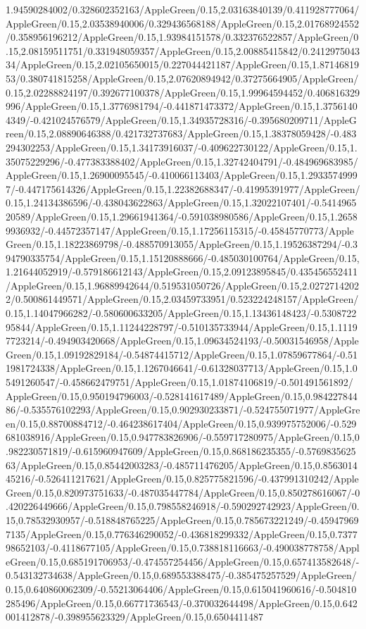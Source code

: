 {\begin{tikzternal}
{1.94590284002/0.328602352163/AppleGreen/0.15,2.03163840139/0.411928777064/AppleGreen/0.15,2.03538940006/0.329436568188/AppleGreen/0.15,2.01768924552/0.358956196212/AppleGreen/0.15,1.93984151578/0.332376522857/AppleGreen/0.15,2.08159511751/0.331948059357/AppleGreen/0.15,2.00885415842/0.241297504334/AppleGreen/0.15,2.02105650015/0.227044421187/AppleGreen/0.15,1.8714681953/0.380741815258/AppleGreen/0.15,2.07620894942/0.37275664905/AppleGreen/0.15,2.02288824197/0.392677100378/AppleGreen/0.15,1.99964594452/0.406816329996/AppleGreen/0.15,1.3776981794/-0.441871473372/AppleGreen/0.15,1.37561404349/-0.421024576579/AppleGreen/0.15,1.34935728316/-0.395680209711/AppleGreen/0.15,2.08890646388/0.421732737683/AppleGreen/0.15,1.38378059428/-0.483294302253/AppleGreen/0.15,1.34173916037/-0.409622730122/AppleGreen/0.15,1.35075229296/-0.477383388402/AppleGreen/0.15,1.32742404791/-0.484969683985/AppleGreen/0.15,1.26900095545/-0.410066113403/AppleGreen/0.15,1.29335749997/-0.447175614326/AppleGreen/0.15,1.22382688347/-0.41995391977/AppleGreen/0.15,1.24134386596/-0.438043622863/AppleGreen/0.15,1.32022107401/-0.541496520589/AppleGreen/0.15,1.29661941364/-0.591038980586/AppleGreen/0.15,1.26589936932/-0.44572357147/AppleGreen/0.15,1.17256115315/-0.45845770773/AppleGreen/0.15,1.18223869798/-0.488570913055/AppleGreen/0.15,1.19526387294/-0.394790335754/AppleGreen/0.15,1.15120888666/-0.485030100764/AppleGreen/0.15,1.21644052919/-0.579186612143/AppleGreen/0.15,2.09123895845/0.435456552411/AppleGreen/0.15,1.96889942644/0.519531050726/AppleGreen/0.15,2.02727142022/0.500861449571/AppleGreen/0.15,2.03459733951/0.523224248157/AppleGreen/0.15,1.14047966282/-0.580600633205/AppleGreen/0.15,1.13436148423/-0.530872295844/AppleGreen/0.15,1.11244228797/-0.510135733944/AppleGreen/0.15,1.11197723214/-0.494903420668/AppleGreen/0.15,1.09634524193/-0.50031546958/AppleGreen/0.15,1.09192829184/-0.54874415712/AppleGreen/0.15,1.07859677864/-0.511981724338/AppleGreen/0.15,1.1267046641/-0.61328037713/AppleGreen/0.15,1.05491260547/-0.458662479751/AppleGreen/0.15,1.01874106819/-0.501491561892/AppleGreen/0.15,0.950194796003/-0.528141617489/AppleGreen/0.15,0.98422784486/-0.535576102293/AppleGreen/0.15,0.902930233871/-0.524755071977/AppleGreen/0.15,0.88700884712/-0.464238617404/AppleGreen/0.15,0.939975752006/-0.529681038916/AppleGreen/0.15,0.947783826906/-0.559717280975/AppleGreen/0.15,0.982230571819/-0.615960947609/AppleGreen/0.15,0.868186235355/-0.576983562563/AppleGreen/0.15,0.85442003283/-0.485711476205/AppleGreen/0.15,0.856301445216/-0.526411217621/AppleGreen/0.15,0.825775821596/-0.437991310242/AppleGreen/0.15,0.820973751633/-0.487035447784/AppleGreen/0.15,0.850278616067/-0.420226449666/AppleGreen/0.15,0.798558246918/-0.590292742923/AppleGreen/0.15,0.78532930957/-0.518848765225/AppleGreen/0.15,0.785673221249/-0.459479697135/AppleGreen/0.15,0.776346290052/-0.436818299332/AppleGreen/0.15,0.737798652103/-0.4118677105/AppleGreen/0.15,0.738818116663/-0.490038778758/AppleGreen/0.15,0.685191706953/-0.474557254456/AppleGreen/0.15,0.657413582648/-0.543132734638/AppleGreen/0.15,0.689553388475/-0.385475257529/AppleGreen/0.15,0.640860062309/-0.55213064406/AppleGreen/0.15,0.615041960616/-0.504810285496/AppleGreen/0.15,0.66771736543/-0.370032644498/AppleGreen/0.15,0.642001412878/-0.398955623329/AppleGreen/0.15,0.6504411487}
\end{tikzternal}}
